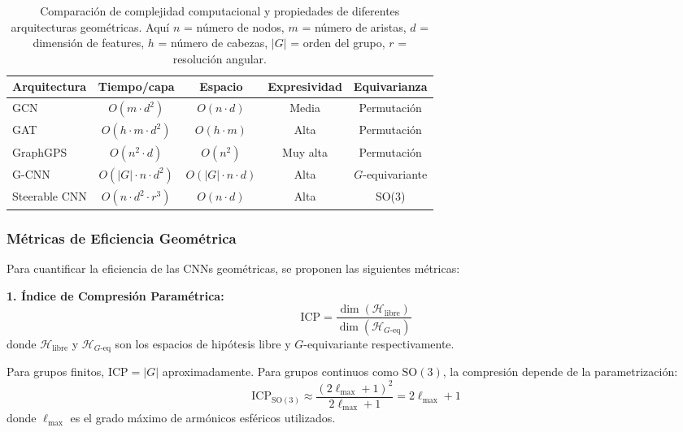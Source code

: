 \begin{table}[h]
\centering
\begin{tabular}{l|c|c|c|c}
\toprule
\textbf{Arquitectura} & \textbf{Tiempo/capa} & \textbf{Espacio} & \textbf{Expresividad} & \textbf{Equivarianza} \\
\midrule
GCN & $O(m \cdot d^2)$ & $O(n \cdot d)$ & Media & Permutación \\
GAT & $O(h \cdot m \cdot d^2)$ & $O(h \cdot m)$ & Alta & Permutación \\
GraphGPS & $O(n^2 \cdot d)$ & $O(n^2)$ & Muy alta & Permutación \\
G-CNN & $O(|G| \cdot n \cdot d^2)$ & $O(|G| \cdot n \cdot d)$ & Alta & $G$-equivariante \\
Steerable CNN & $O(n \cdot d^2 \cdot r^3)$ & $O(n \cdot d)$ & Alta & SO(3) \\
\bottomrule
\end{tabular}
\caption[Complejidad computacional de arquitecturas geométricas]{Comparación de complejidad computacional y propiedades de diferentes arquitecturas geométricas. Aquí $n$ = número de nodos, $m$ = número de aristas, $d$ = dimensión de features, $h$ = número de cabezas, $|G|$ = orden del grupo, $r$ = resolución angular.}
\label{tab:complejidad_arquitecturas_geometricas}
\end{table}

\subsubsection{Métricas de Eficiencia Geométrica}\label{subsubsec:metricas_eficiencia_geometrica}

Para cuantificar la eficiencia de las CNNs geométricas, se proponen las siguientes métricas:

\textbf{1. Índice de Compresión Paramétrica:}
\begin{equation}
\text{ICP} = \frac{\dim(\mathcal{H}_{\text{libre}})}{\dim(\mathcal{H}_{G\text{-eq}})}
\end{equation}
donde $\mathcal{H}_{\text{libre}}$ y $\mathcal{H}_{G\text{-eq}}$ son los espacios de hipótesis libre y $G$-equivariante respectivamente.

Para grupos finitos, $\text{ICP} = |G|$ aproximadamente. Para grupos continuos como $\text{SO}(3)$, la compresión depende de la parametrización:
\begin{equation}
\text{ICP}_{\text{SO}(3)} \approx \frac{(2\ell_{\max} + 1)^2}{2\ell_{\max} + 1} = 2\ell_{\max} + 1
\end{equation}
donde $\ell_{\max}$ es el grado máximo de armónicos esféricos utilizados.

